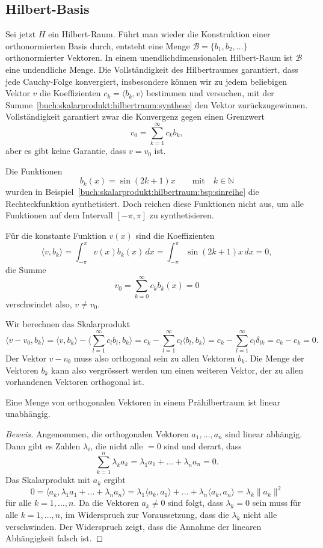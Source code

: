 %
%
\subsection{Hilbert-Basis}
Sei jetzt $H$ ein Hilbert-Raum.
Führt man wieder die Konstruktion einer orthonormierten Basis durch,
entsteht eine Menge $\mathcal{B}=\{b_1,b_2,\dots\}$ orthonormierter
Vektoren.
In einem unendlichdimensionalen Hilbert-Raum ist $\mathcal{B}$ eine
undendliche Menge.
Die Vollständigkeit des Hilbertraumes garantiert, dass jede
Cauchy-Folge konvergiert, insbesondere können wir zu jedem beliebigen
Vektor $v$ die Koeffizienten $c_k=\langle b_k,v \rangle$ bestimmen
und versuchen, mit der
Summe~\eqref{buch:skalarprodukt:hilbertraum:synthese}
den Vektor zurückzugewinnen.
Vollständigkeit garantiert zwar die Konvergenz gegen einen Grenzwert
\[
v_0 = \sum_{k=1}^\infty c_k b_k,
\]
aber es gibt keine Garantie, dass $v=v_0$ ist.

\begin{beispiel}
Die Funktionen
\[
b_k(x) = \sin (2k+1)x
\qquad\text{mit}\quad
k\in \mathbb{N}
\]
wurden in Beispiel~\ref{buch:skalarprodukt:hilbertraum:bsp:sinreihe}
die Rechteckfunktion synthetisiert.
Doch reichen diese Funktionen nicht aus, um alle Funktionen auf
dem Intervall $[-\pi,\pi]$ zu synthetisieren.

Für die konstante Funktion $v(x)$ sind die Koeffizienten
\[
\langle v,b_k\rangle
=
\int_{-\pi}^\pi v(x)b_k(x)\,dx
=
\int_{-\pi}^\pi \sin (2k+1)x\,dx
=
0,
\]
die Summe
\[
v_0
=
\sum_{k=0}^\infty
c_k
b_k(x)
=
0
\]
verschwindet also, $v\ne v_0$.
\end{beispiel}

Wir berechnen das Skalarprodukt 
\[
\langle v-v_0,b_k\rangle
=
\langle v,b_k\rangle
-
\biggl\langle \sum_{l=1}^\infty c_lb_l,b_k\biggr\rangle
=
c_k - \sum_{l=1}^\infty c_l\langle b_l,b_k\rangle
=
c_k - \sum_{l=1}^\infty c_l\delta_{lk}
=
c_k-c_k=0.
\]
Der Vektor $v-v_0$ muss also orthogonal sein zu allen Vektoren
$b_k$.
Die Menge der Vektoren $b_k$ kann also vergrössert werden um einen
weiteren Vektor, der zu allen vorhandenen Vektoren orthogonal ist.

\begin{satz}
Eine Menge von orthogonalen Vektoren in einem Prähilbertraum ist linear 
unabhängig.
\end{satz}

\begin{proof}[Beweis]
Angenommen, die orthogonalen Vektoren  $a_1,\dots,a_n$ sind linear
abhängig.
Dann gibt es Zahlen $\lambda_i$, die nicht alle $=0$ sind und derart,
dass
\[
\sum_{k=1}^n \lambda_ka_k
=
\lambda_1 a_1 + \ldots + \lambda_n a_n
=
0.
\]
Das Skalarprodukt mit $a_k$ ergibt
\[
0
=
\langle a_k,\lambda_1a_1 +\ldots + \lambda_na_n\rangle
=
\lambda_1
\langle a_k,a_1\rangle
+
\ldots
+
\lambda_n
\langle a_k,a_n\rangle
=
\lambda_k \|a_k\|^2
\]
für alle $k=1,\dots,n$.
Da die Vektoren $a_k\ne 0$ sind folgt, dass $\lambda_k=0$ sein muss
für alle $k=1,\dots,n$, im Widerspruch zur Voraussetzung, dass die
$\lambda_k$ nicht alle verschwinden.
Der Widerspruch zeigt, dass die Annahme der linearen Abhängigkeit
falsch ist.
\end{proof}


